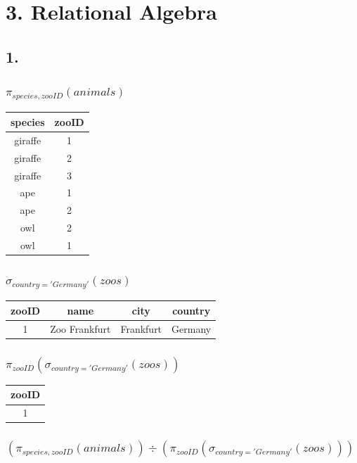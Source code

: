 \documentclass[10pt,a4paper,final]{report}
\begin{document}
\section*{3. Relational Algebra}
\subsection*{1.}
\subsubsection*{$\pi_{species, zooID} (animals)$}
\begin{tabular}{|c|c|}
\hline 
species & zooID \\ 
\hline 
giraffe & 1 \\ 
\hline 
giraffe & 2 \\ 
\hline 
giraffe & 3 \\ 
\hline 
ape & 1 \\ 
\hline 
ape & 2 \\ 
\hline 
owl & 2 \\ 
\hline 
owl & 1 \\ 
\hline 
\end{tabular} 

\subsubsection*{$\sigma_{country='Germany'}(zoos)$}
\begin{tabular}{|c|c|c|c|}
\hline 
zooID & name & city & country \\ 
\hline 
1 & Zoo Frankfurt & Frankfurt & Germany \\ 
\hline 
\end{tabular} 

\subsubsection*{$\pi_{zooID}(\sigma_{country='Germany'}(zoos))$}
\begin{tabular}{|c|}
\hline 
zooID \\ 
\hline 
1 \\ 
\hline
\end{tabular}

\subsubsection*{$(\pi_{species, zooID} (animals)) \div (\pi_{zooID}(\sigma_{country='Germany'}(zoos)))$}
\end{document}
